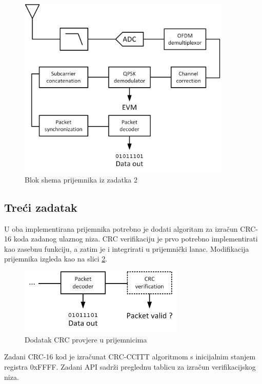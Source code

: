 \documentclass[a4paper]{article}
\begin{document}
\begin{figure}[h!]
\centering
\includegraphics[width=0.9\textwidth]{Task2.png}
\caption{Blok shema prijemnika iz zadatka 2}
\label{fig:task2}
\end{figure}

\subsection{Treći zadatak}
U oba implementirana prijemnika potrebno je dodati algoritam za izračun CRC-16 koda zadanog ulaznog niza. CRC verifikaciju je prvo potrebno implementirati kao zasebnu funkciju, a zatim je i integrirati u prijemnički lanac. Modifikacija prijemnika izgleda kao na slici \ref{fig:task3}.

\begin{figure}[h!]
\centering
\includegraphics[width=0.7\textwidth]{Task3.png}
\caption{Dodatak CRC provjere u prijemnicima}
\label{fig:task3}
\end{figure}

Zadani CRC-16 kod je izračunat CRC-CCITT algoritmom s inicijalnim stanjem registra 0xFFFF. Zadani API sadrži preglednu tablicu za izračun verifikacijskog niza.
\end{document}
